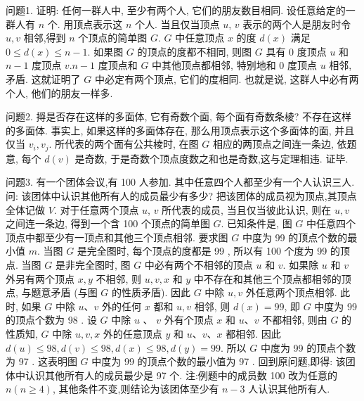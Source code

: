 
问题1. 证明: 任何一群人中, 至少有两个人, 它们的朋友数目相同.
设任意给定的一群人有 $n$ 个.
用顶点表示这 $n$ 个人.
当且仅当顶点 $u$, $v$ 表示的两个人是朋友时令 $u, v$ 相邻,得到 $n$ 个顶点的简单图 $G$.
$G$ 中任意顶点 $x$ 的度 $d(x)$ 满足 $0 \leqslant d(x) \leqslant n-1$. 如果图 $G$ 的顶点的度都不相同, 则图 $G$ 具有 0 度顶点 $u$ 和 $n-1$ 度顶点 $v . n-1$ 度顶点和 $G$ 中其他顶点都相邻, 特别地和 0 度顶点 $u$ 相邻, 矛盾.
这就证明了 $G$ 中必定有两个顶点, 它们的度相同.
也就是说, 这群人中必有两个人, 他们的朋友一样多.



问题2. 㩊是否存在这样的多面体, 它有奇数个面, 每个面有奇数条棱?
不存在这样的多面体.
事实上, 如果这样的多面体存在, 那么用顶点表示这个多面体的面, 并且仅当 $v_i, v_j$. 所代表的两个面有公共棱时, 在图 $G$ 相应的两顶点之间连一条边, 依题意, 每个 $d(v)$ 是奇数, 于是奇数个顶点度数之和也是奇数,这与定理相违.
证毕.



问题3. 有一个团体会议,有 100 人参加.
其中任意四个人都至少有一个人认识三人.
问: 该团体中认识其他所有人的成员最少有多少?
把该团体的成员视为顶点,其顶点全体记做 $V$. 对于任意两个顶点 $u$, $v$ 所代表的成员, 当且仅当彼此认识, 则在 $u, v$ 之间连一条边, 得到一个含 100 个顶点的简单图 $G$. 已知条件是, 图 $G$ 中任意四个顶点中都至少有一顶点和其他三个顶点相邻.
要求图 $G$ 中度为 99 的顶点个数的最小值 $m$.
当图 $G$ 是完全图时, 每个顶点的度都是 99 , 所以有 100 个度为 99 的顶点.
当图 $G$ 是非完全图时, 图 $G$ 中必有两个不相邻的顶点 $u$ 和 $v$. 如果除 $u$ 和 $v$ 外另有两个顶点 $x, y$ 不相邻, 则 $u, v, x$ 和 $y$ 中不存在和其他三个顶点都相邻的顶点, 与题意矛盾 (与图 $G$ 的性质矛盾). 因此 $G$ 中除 $u, v$ 外任意两个顶点相邻.
此时, 如果 $G$ 中除 $u 、 v$ 外的任何 $x$ 都和 $u, v$ 相邻, 则 $d(x)=99$, 即 $G$ 中度为 99 的顶点个数为 98 . 设 $G$ 中除 $u$ 、 $v$ 外有个顶点 $x$ 和 $u 、 v$ 不都相邻, 则由 $G$ 的性质知, $G$ 中除 $u, v, x$ 外的任意顶点 $y$ 和 $u 、 v 、 x$ 都相邻.
因此 $d(u) \leqslant 98, d(v) \leqslant 98, d(x) \leqslant 98, d(y)=99$. 所以 $G$ 中度为 99 的顶点个数为 97 .
这表明图 $G$ 中度为 99 的顶点个数的最小值为 97 .
回到原问题,即得: 该团体中认识其他所有人的成员最少是 97 个.
注:例题中的成员数 100 改为任意的 $n(n \geqslant 4)$, 其他条件不变,则结论为该团体至少有 $n-3$ 人认识其他所有人.



